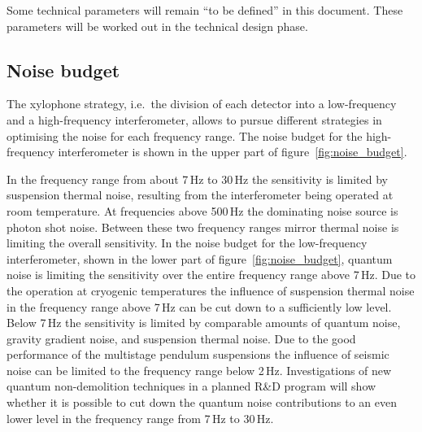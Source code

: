 Some technical parameters will remain ``to be defined'' in this document. These parameters will be worked out in the technical design phase.

\subsection{\label{Noisebudget}Noise budget}

The xylophone strategy, i.e.\ the division of each detector into a low-frequency 
and a high-frequency interferometer, allows to pursue different strategies in 
optimising the noise for each frequency range. The noise budget for the 
high-frequency interferometer is shown in the upper part of figure~\ref{fig:noise_budget}. 

In the frequency range from about 7\,Hz to 30\,Hz the sensitivity is limited by
suspension thermal noise, resulting from the interferometer being operated 
at room temperature. At frequencies above 500\,Hz the dominating noise 
source is photon shot noise. Between these two frequency ranges mirror 
thermal noise is limiting the overall sensitivity. In the noise budget for the 
low-frequency interferometer, shown in the lower part of 
figure~\ref{fig:noise_budget}, quantum noise is limiting the sensitivity over 
the entire frequency range above 7\,Hz. Due to the operation at cryogenic 
temperatures the influence of suspension thermal noise in the frequency 
range above 7\,Hz can be cut down to a sufficiently low level. Below 7\,Hz 
the sensitivity is limited by comparable amounts of quantum noise, 
gravity gradient noise, and suspension thermal noise. Due to the good 
performance of the multistage pendulum suspensions the influence of 
seismic noise can be limited to the frequency range below 2\,Hz. Investigations 
of new quantum non-demolition techniques in a planned R\&D program will 
show whether it is possible to cut down the quantum noise contributions to 
an even lower level in the frequency range from 7\,Hz to 30\,Hz.

